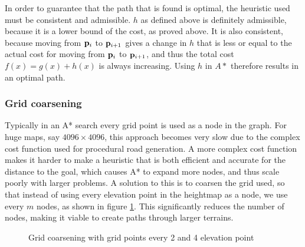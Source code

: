 In order to guarantee that the path that is found is optimal, the heuristic used must be consistent and admissible. $h$ as defined above is definitely admissible, because it is a lower bound of the cost, as proved above. It is also consistent, because moving from ${\mathbf p}_i$ to ${\mathbf p}_{i+1}$ gives a change in $h$ that is less or equal to the actual cost for moving from ${\mathbf p}_i$ to ${\mathbf p}_{i+1}$, and thus the total cost $f(x) = g(x)+h(x)$ is always increasing. Using $h$ in $A*$ therefore results in an optimal path.

\subsubsection{Grid coarsening}
Typically in an A* search every grid point is used as a node in the graph. For huge maps, say $4096\times 4096$, this approach becomes very slow due to the complex cost function used for procedural road generation. A more complex cost function makes it harder to make a heuristic that is both efficient and accurate for the distance to the goal, which causes A* to expand more nodes, and thus scale poorly with larger problems. A solution to this is to coarsen the grid used, so that instead of using every elevation point in the heightmap as a node, we use every $m$ nodes, as shown in figure \ref{fig:grid_coarsening}. This significantly reduces the number of nodes, making it viable to create paths through larger terrains.

\begin{figure}[ht]
\centering
{}
\qquad
{}
\caption{Grid coarsening with grid points every 2 and 4 elevation point}
\label{fig:grid_coarsening}
\end{figure}


